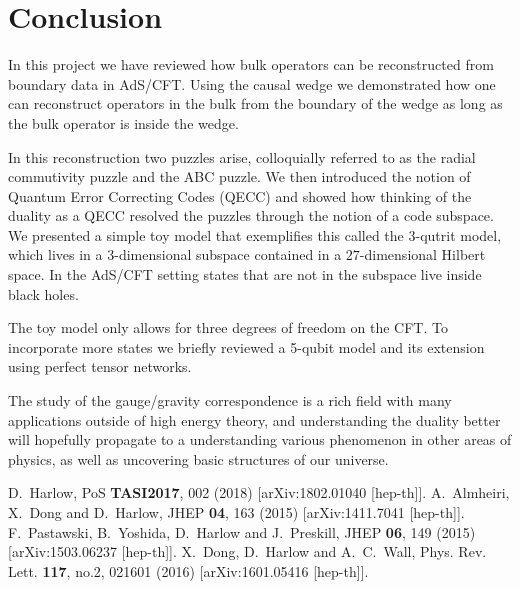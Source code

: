 \documentclass[letter,12pt]{article}
\begin{document}
\section{Conclusion}
In this project we have reviewed how bulk operators can be reconstructed from boundary data in AdS/CFT. Using the causal wedge we demonstrated how one can reconstruct operators in the bulk from the boundary of the wedge as long as the bulk operator is inside the wedge.

In this reconstruction two puzzles arise, colloquially referred to as the radial commutivity puzzle and the ABC puzzle. We then introduced the notion of Quantum Error Correcting Codes (QECC) and showed how thinking of the duality as a QECC resolved the puzzles through the notion of a code subspace. We presented a simple toy model that exemplifies this called the 3-qutrit model, which lives in a 3-dimensional subspace contained in a $27$-dimensional Hilbert space. In the AdS/CFT setting states that are not in the subspace live inside black holes.

The toy model only allows for three degrees of freedom on the CFT. To incorporate more states we briefly reviewed a 5-qubit model and its extension using perfect tensor networks.

The study of the gauge/gravity correspondence is a rich field with many applications outside of high energy theory, and understanding the duality better will hopefully propagate to a understanding various phenomenon in other areas of physics, as well as uncovering basic structures of our universe.
\newpage
\begin{thebibliography}{99}
	D.~Harlow,
	PoS \textbf{TASI2017}, 002 (2018)
	[arXiv:1802.01040 [hep-th]].
	A.~Almheiri, X.~Dong and D.~Harlow,
	JHEP \textbf{04}, 163 (2015)
	[arXiv:1411.7041 [hep-th]].
	F.~Pastawski, B.~Yoshida, D.~Harlow and J.~Preskill,
	JHEP \textbf{06}, 149 (2015)
	[arXiv:1503.06237 [hep-th]].
	X.~Dong, D.~Harlow and A.~C.~Wall,
	Phys. Rev. Lett. \textbf{117}, no.2, 021601 (2016)
	[arXiv:1601.05416 [hep-th]].
\end{thebibliography}
\end{document}
